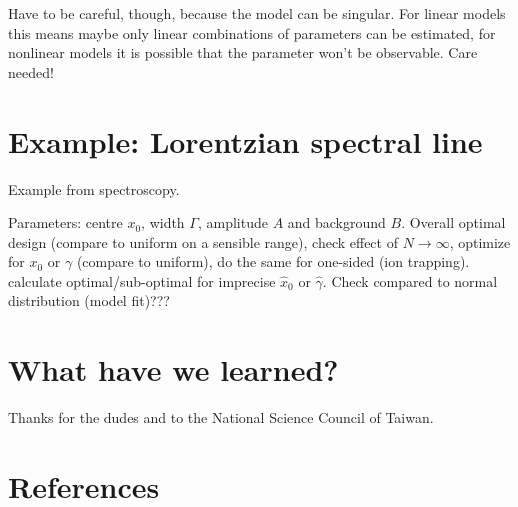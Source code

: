 \documentclass[12pt]{iopart}
\begin{document}
Have to be careful, though, because the model can be singular. For linear models this means maybe only linear combinations of parameters can be estimated, for nonlinear models it is possible that the parameter won't be observable. Care needed!

\section{Example: Lorentzian spectral line}

Example from spectroscopy.

Parameters: centre $x_0$, width $\Gamma$, amplitude $A$ and background $B$. Overall optimal design (compare to uniform on a sensible range), check effect of $N \rightarrow \infty$, optimize for $x_0$ or $\gamma$ (compare to uniform), do the same for one-sided (ion trapping). calculate optimal/sub-optimal for imprecise $\hat x_0$ or $\hat\gamma$. Check compared to normal distribution (model fit)???

\section{What have we learned?}

\ack Thanks for the dudes and to the National Science Council of Taiwan.

\section*{References}


\end{document}
